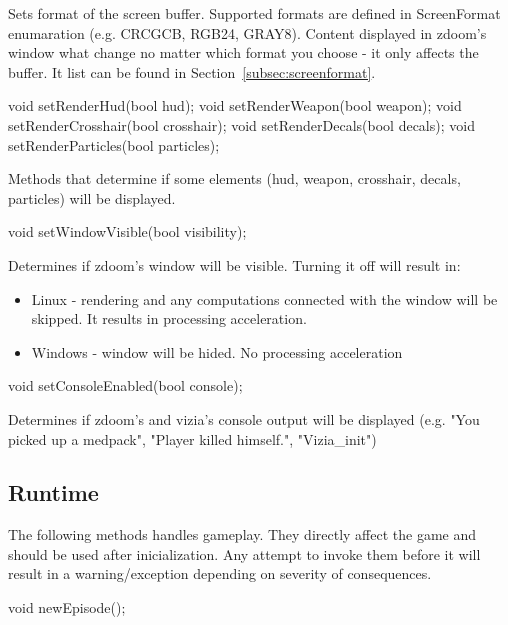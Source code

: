 Sets format of the screen buffer. Supported formats are defined in ScreenFormat enumaration (e.g. CRCGCB, RGB24, GRAY8). Content displayed in zdoom's window what change no matter which format you choose - it only affects the buffer. It list can be found in Section~\ref{subsec:screenformat}.


\vspace{20pt}
\begin{clinee}       
void setRenderHud(bool hud);
void setRenderWeapon(bool weapon);
void setRenderCrosshair(bool crosshair);
void setRenderDecals(bool decals);
void setRenderParticles(bool particles);
\end{clinee}

Methods that determine if some elements (hud, weapon, crosshair, decals, particles) will be displayed.


\vspace{20pt}
\begin{clinee}
void setWindowVisible(bool visibility);
\end{clinee}

Determines if zdoom's window will be visible.
Turning it off will result in:
\begin{itemize}
\item Linux - rendering and any computations connected with the window will be skipped. It results in processing acceleration.
\item Windows - window will be hided. No processing acceleration
\end{itemize}


\vspace{20pt}
\begin{clinee}
void setConsoleEnabled(bool console);
\end{clinee}

Determines if zdoom's and vizia's console output will be displayed (e.g. "You picked up a medpack", "Player killed himself.", "Vizia\_init")


\vspace{20pt}
\subsection{Runtime}\label{subsec:runtime_methods}
The following methods handles gameplay. They directly affect the game and should be used after inicialization. 
Any attempt to invoke them before it will result in a warning/exception depending on severity of consequences. 


\vspace{20pt}
\begin{clinee}
void newEpisode();
\end{clinee}

